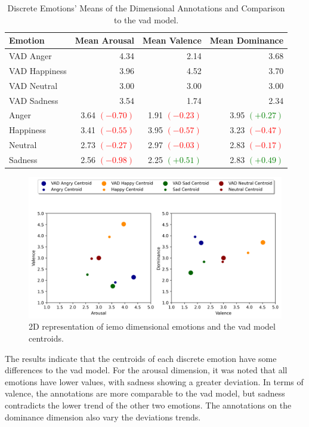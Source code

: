 \begin{table}[H]
	\centering
	\caption{Discrete Emotions' Means of the Dimensional Annotations and Comparison to the \ac{vad} model.}
	\label{tab:dis_dim}
	\begin{tabular}{lrrr}
		\toprule
		Emotion & Mean Arousal &   Mean Valence & Mean Dominance \\
		\midrule
		VAD Anger     & 4.34 & 2.14 & 3.68 \\
		VAD Happiness & 3.96 & 4.52 & 3.70 \\
		VAD Neutral   & 3.00 & 3.00 & 3.00 \\
		VAD Sadness   & 3.54 & 1.74 & 2.34 \\
		\addlinespace
		Anger   	&   3.64 \textcolor{red}{$(-0.70)$} &  1.91 \textcolor{red}{$(-0.23)$} &  3.95 \textcolor{green}{$(+0.27)$} \\
		Happiness   &   3.41 \textcolor{red}{$(-0.55)$} &  3.95 \textcolor{red}{$(-0.57)$} &  3.23 \textcolor{red}{$(-0.47)$} \\
		Neutral 	&   2.73 \textcolor{red}{$(-0.27)$} &  2.97 \textcolor{red}{$(-0.03)$} &  2.83 \textcolor{red}{$(-0.17)$} \\
		Sadness     &   2.56 \textcolor{red}{$(-0.98)$} &  2.25 \textcolor{green}{$(+0.51)$} &  2.83 \textcolor{green}{$(+0.49)$} \\
		\bottomrule
	\end{tabular}
\end{table}


\begin{figure}[H]
  \centering
  \includegraphics[width=.9\linewidth]{figs/5_data_stratification/primitives_visualization_2d.png}
  \caption{2D representation of \ac{iemo} dimensional emotions and the \ac{vad} model centroids.}
  \label{fig:2dplane}
\end{figure}

The results indicate that the centroids of each discrete emotion have some differences to the \ac{vad} model. For the arousal dimension, it was noted that all emotions have lower values, with sadness showing a greater deviation. In terms of valence, the annotations are more comparable to the \ac{vad} model, but sadness contradicts the lower trend of the other two emotions. The annotations on the dominance dimension also vary the deviations trends.

